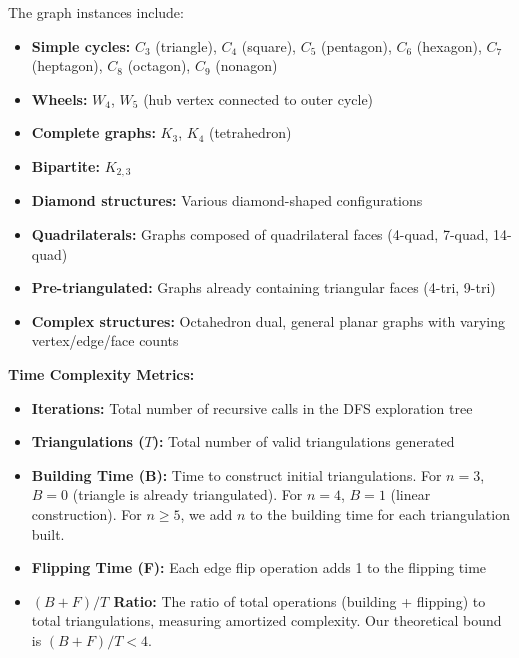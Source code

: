 \documentclass[12pt,a4paper]{article}
\theoremstyle{definition}
\theoremstyle{remark}
\begin{document}
The graph instances include:
\begin{itemize}
    \item \textbf{Simple cycles:} $C_3$ (triangle), $C_4$ (square), $C_5$ (pentagon), $C_6$ (hexagon), $C_7$ (heptagon), $C_8$ (octagon), $C_9$ (nonagon)
    \item \textbf{Wheels:} $W_4$, $W_5$ (hub vertex connected to outer cycle)
    \item \textbf{Complete graphs:} $K_3$, $K_4$ (tetrahedron)
    \item \textbf{Bipartite:} $K_{2,3}$
    \item \textbf{Diamond structures:} Various diamond-shaped configurations
    \item \textbf{Quadrilaterals:} Graphs composed of quadrilateral faces (4-quad, 7-quad, 14-quad)
    \item \textbf{Pre-triangulated:} Graphs already containing triangular faces (4-tri, 9-tri)
    \item \textbf{Complex structures:} Octahedron dual, general planar graphs with varying vertex/edge/face counts
\end{itemize}

\textbf{Time Complexity Metrics:}
\begin{itemize}
    \item \textbf{Iterations:} Total number of recursive calls in the DFS exploration tree
    \item \textbf{Triangulations ($T$):} Total number of valid triangulations generated
    \item \textbf{Building Time (B):} Time to construct initial triangulations. For $n = 3$, $B = 0$ (triangle is already triangulated). For $n = 4$, $B = 1$ (linear construction). For $n \geq 5$, we add $n$ to the building time for each triangulation built.
    \item \textbf{Flipping Time (F):} Each edge flip operation adds 1 to the flipping time
    \item \textbf{$(B+F)/T$ Ratio:} The ratio of total operations (building + flipping) to total triangulations, measuring amortized complexity. Our theoretical bound is $(B+F)/T < 4$.
\end{itemize}
\end{document}
